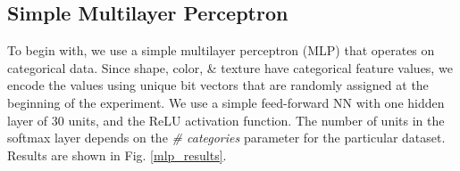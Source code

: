 

\subsection{Simple Multilayer Perceptron}
To begin with, we use a simple multilayer perceptron (MLP) that operates on categorical
data. Since shape, color, \& texture have categorical feature values, we encode the values
using unique bit vectors that are randomly assigned at the beginning of the experiment. We
use a simple feed-forward NN with one hidden layer of 30 units, and the ReLU activation
function. The number of units in the softmax layer depends on the \textit{\# categories}
parameter for the particular dataset. Results are shown in Fig. \ref{mlp_results}.

